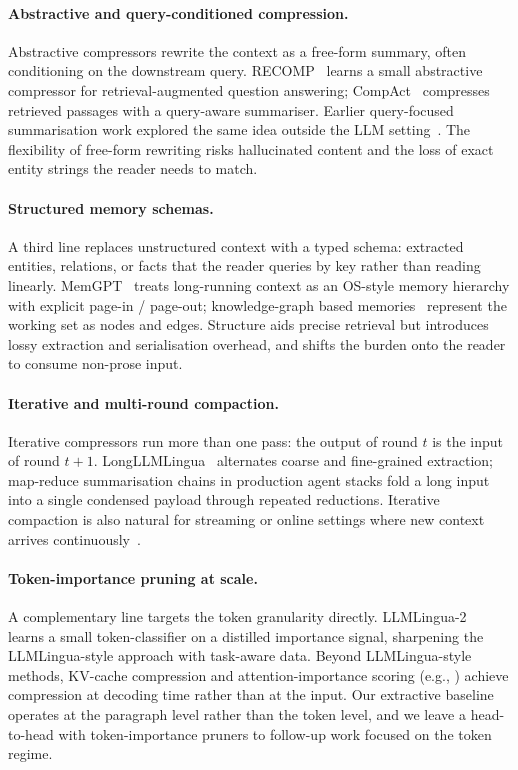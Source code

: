 \documentclass[10pt,twocolumn]{article}
\begin{document}
\paragraph{Abstractive and query-conditioned compression.}
Abstractive compressors rewrite the context as a free-form summary, often conditioning on the downstream query. RECOMP~\cite{xu2023recomp} learns a small abstractive compressor for retrieval-augmented question answering; CompAct~\cite{yoon2024compact} compresses retrieved passages with a query-aware summariser. Earlier query-focused summarisation work explored the same idea outside the LLM setting~\cite{daume2006bayesian,baumel2018query}. The flexibility of free-form rewriting risks hallucinated content and the loss of exact entity strings the reader needs to match.

\paragraph{Structured memory schemas.}
A third line replaces unstructured context with a typed schema: extracted entities, relations, or facts that the reader queries by key rather than reading linearly. MemGPT~\cite{packer2023memgpt} treats long-running context as an OS-style memory hierarchy with explicit page-in / page-out; knowledge-graph based memories~\cite{edge2024graphrag,zhong2023memorybank} represent the working set as nodes and edges. Structure aids precise retrieval but introduces lossy extraction and serialisation overhead, and shifts the burden onto the reader to consume non-prose input.

\paragraph{Iterative and multi-round compaction.}
Iterative compressors run more than one pass: the output of round $t$ is the input of round $t+1$. LongLLMLingua~\cite{jiang2024longllmlingua} alternates coarse and fine-grained extraction; map-reduce summarisation chains in production agent stacks fold a long input into a single condensed payload through repeated reductions. Iterative compaction is also natural for streaming or online settings where new context arrives continuously~\cite{xiao2024streamingllm}.

\paragraph{Token-importance pruning at scale.}
A complementary line targets the token granularity directly. LLMLingua-2~\cite{pan2024llmlingua2} learns a small token-classifier on a distilled importance signal, sharpening the LLMLingua-style approach with task-aware data. Beyond LLMLingua-style methods, KV-cache compression and attention-importance scoring (e.g., \cite{xiao2024streamingllm}) achieve compression at decoding time rather than at the input. Our extractive baseline operates at the paragraph level rather than the token level, and we leave a head-to-head with token-importance pruners to follow-up work focused on the token regime.
\end{document}
